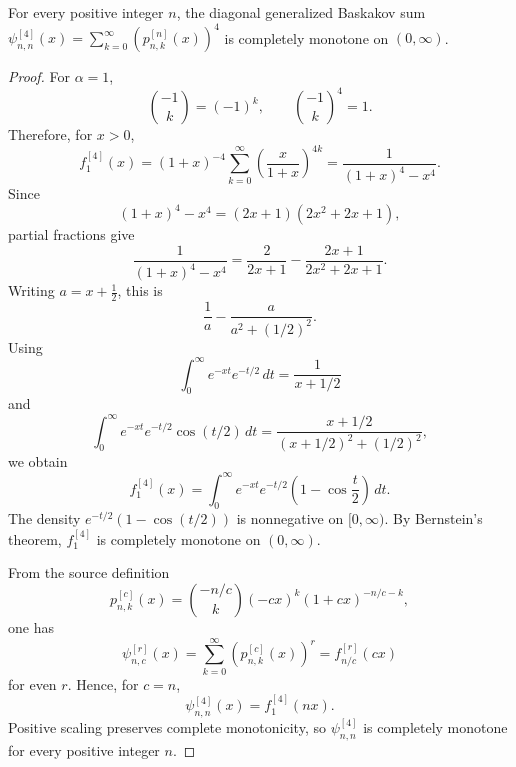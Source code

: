 \begin{proposition}
\label{res:baskakov-diagonal-r4-c-equals-n-cm}
For every positive integer \(n\), the diagonal generalized Baskakov sum \(\psi^{[4]}_{n,n}(x)=\sum_{k=0}^{\infty}(p^{[n]}_{n,k}(x))^4\) is completely monotone on \((0,\infty)\).
\end{proposition}
\begin{proof}
For \(\alpha=1\),
\[
\binom{-1}{k}=(-1)^k,
\qquad
\binom{-1}{k}^{4}=1.
\]
Therefore, for \(x>0\),
\[
f^{[4]}_1(x)
=(1+x)^{-4}\sum_{k=0}^{\infty}
\left(\frac{x}{1+x}\right)^{4k}
=\frac{1}{(1+x)^4-x^4}.
\]
Since
\[
(1+x)^4-x^4=(2x+1)(2x^2+2x+1),
\]
partial fractions give
\[
\frac{1}{(1+x)^4-x^4}
=\frac{2}{2x+1}-\frac{2x+1}{2x^2+2x+1}.
\]
Writing \(a=x+\frac12\), this is
\[
\frac{1}{a}-\frac{a}{a^2+(1/2)^2}.
\]
Using
\[
\int_0^\infty e^{-xt}e^{-t/2}\,dt=\frac{1}{x+1/2}
\]
and
\[
\int_0^\infty e^{-xt}e^{-t/2}\cos(t/2)\,dt
=\frac{x+1/2}{(x+1/2)^2+(1/2)^2},
\]
we obtain
\[
f^{[4]}_1(x)
=\int_0^\infty e^{-xt}e^{-t/2}\left(1-\cos\frac{t}{2}\right)\,dt.
\]
The density \(e^{-t/2}(1-\cos(t/2))\) is nonnegative on \([0,\infty)\). By Bernstein's theorem, \(f^{[4]}_1\) is completely monotone on \((0,\infty)\).

From the source definition
\[
p^{[c]}_{n,k}(x)=\binom{-n/c}{k}(-cx)^k(1+cx)^{-n/c-k},
\]
one has
\[
\psi^{[r]}_{n,c}(x)=\sum_{k=0}^{\infty}\left(p^{[c]}_{n,k}(x)\right)^r
=f^{[r]}_{n/c}(cx)
\]
for even \(r\). Hence, for \(c=n\),
\[
\psi^{[4]}_{n,n}(x)=f^{[4]}_1(nx).
\]
Positive scaling preserves complete monotonicity, so \(\psi^{[4]}_{n,n}\) is completely monotone for every positive integer \(n\).
\end{proof}

